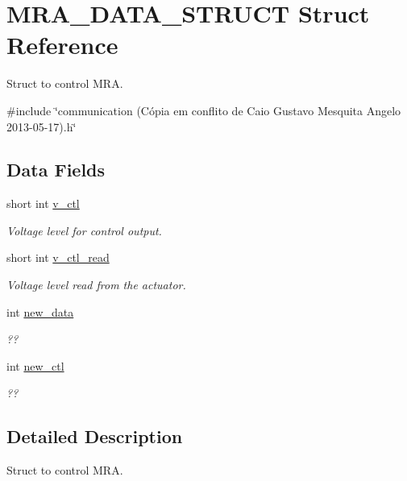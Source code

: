 \hypertarget{structMRA__DATA__STRUCT}{\section{M\-R\-A\-\_\-\-D\-A\-T\-A\-\_\-\-S\-T\-R\-U\-C\-T Struct Reference}
\label{structMRA__DATA__STRUCT}
}


Struct to control M\-R\-A.  




{\ttfamily \#include \char`\"{}communication (\-Cópia em conflito de Caio Gustavo Mesquita Angelo 2013-\/05-\/17).\-h\char`\"{}}

\subsection*{Data Fields}
\begin{DoxyCompactItemize}
\item 
short int \hyperlink{structMRA__DATA__STRUCT_a64b4e6bb604e58de593a60c87942b966}{v\-\_\-ctl}
\begin{DoxyCompactList}\small\item\em Voltage level for control output. \end{DoxyCompactList}\item 
short int \hyperlink{structMRA__DATA__STRUCT_a3a31d57268c33b21ac915fdc27dfe474}{v\-\_\-ctl\-\_\-read}
\begin{DoxyCompactList}\small\item\em Voltage level read from the actuator. \end{DoxyCompactList}\item 
int \hyperlink{structMRA__DATA__STRUCT_afca6e851d302f3a786885a4e1eec79d7}{new\-\_\-data}
\begin{DoxyCompactList}\small\item\em ?? \end{DoxyCompactList}\item 
int \hyperlink{structMRA__DATA__STRUCT_a5b1af89ee717f5b14c18e8ac12e93e75}{new\-\_\-ctl}
\begin{DoxyCompactList}\small\item\em ?? \end{DoxyCompactList}\end{DoxyCompactItemize}


\subsection{Detailed Description}
Struct to control M\-R\-A. 

